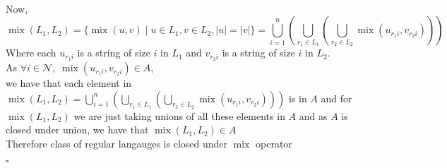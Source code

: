 \documentclass[addpoints]{exam}
\begin{document}
\begin{questions}
\begin{solution}
		\\Now,
		$$\operatorname{mix}(L_1,L_2) = \{\operatorname{mix}(u,v) \mid u\in L_1, v\in L_2, |u| = |v|\} = \bigcup\limits_{i=1}^{n} \left( \bigcup\limits_{r_1 \in L_1}\left( \bigcup\limits_{r_2 \in L_2}\operatorname{mix}(u_{r_1i},v_{r_2i}) \right)\right)$$
		Where each $u_{r_1i}$ is a string of size $i$ in $L_1$ and $v_{r_2i}$ is a string of size $i$ in $L_2$.
		\\As $\forall i \in \mathcal{N}, \; \operatorname{mix}(u_{r_1i},v_{r_2i}) \in A$,
		\\we have that each element in $ \operatorname{mix}(L_1,L_2) = \bigcup\limits_{i=1}^{n} \left( \bigcup\limits_{r_1 \in L_1}\left( \bigcup\limits_{r_2 \in L_2}\operatorname{mix}(u_{r_1i},v_{r_2i}) \right)\right)$ is in $A$ and for $\operatorname{mix}(L_1,L_2)$ we are just taking unions of all these elements in $A$ and as $A$ is closed under union, we have that $\operatorname{mix}(L_1,L_2) \in A$
		\\Therefore class of regular langauges is closed under $\operatorname{mix}$ operator
		\begin{flushright}
			$\square$
		\end{flushright}
	\end{solution}

\end{questions}
\end{document}
